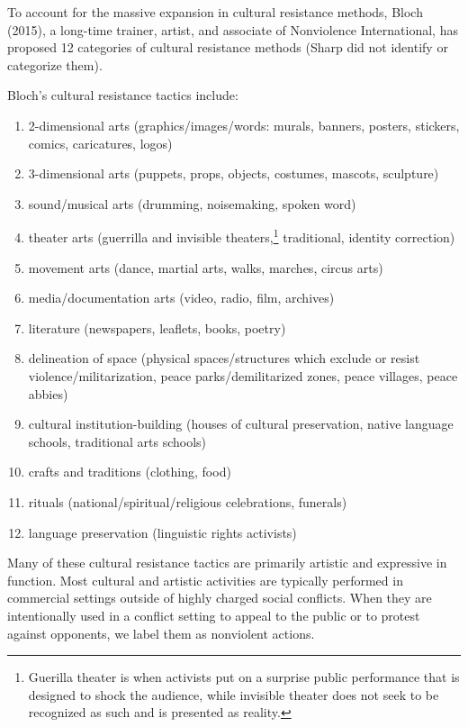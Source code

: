 \documentclass[twoside,a4paper,12pt,fleqn,openany]{extbook}
\begin{document}
To account for the massive expansion in cultural resistance methods, Bloch (2015), a long-time trainer, artist, and associate of Nonviolence International, has proposed 12 categories of cultural resistance methods (Sharp did not identify or categorize them).

Bloch’s cultural resistance tactics include:

\begin{enumerate}
\item 2-dimensional arts (graphics/images/words: murals, banners, posters, stickers,
comics, caricatures, logos)
\item 3-dimensional arts (puppets, props, objects, costumes, mascots, sculpture)
\item sound/musical arts (drumming, noisemaking, spoken word)
\item theater arts (guerrilla and invisible theaters,\footnote{Guerilla theater is when activists put on a surprise public performance that is designed to shock the audience, while invisible theater does not seek to be recognized as such and is presented as reality.} traditional, identity correction)
\item movement arts (dance, martial arts, walks, marches, circus arts)
\item media/documentation arts (video, radio, film, archives)
\item literature (newspapers, leaflets, books, poetry)
\item delineation of space (physical spaces/structures which exclude or resist violence/militarization, peace parks/demilitarized zones, peace villages, peace abbies)
\item cultural institution-building (houses of cultural preservation, native language schools, traditional arts schools)
\item crafts and traditions (clothing, food)
\item rituals (national/spiritual/religious celebrations, funerals)
\item language preservation (linguistic rights activists)
\end{enumerate}

Many of these cultural resistance tactics are primarily artistic and expressive in function. Most cultural and artistic activities are typically performed in commercial settings outside of highly charged social conflicts. When they are intentionally used in a conflict setting to appeal to the public or to protest against opponents, we label them as nonviolent actions.
\end{document}
